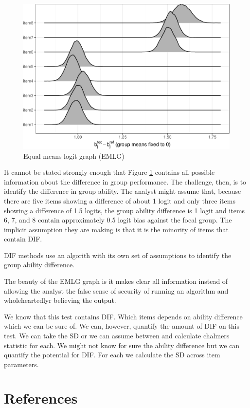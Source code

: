\documentclass[
  11pt,
]{article}
\begin{document}
\begin{figure}[H]

{\centering \includegraphics[width=0.7\linewidth]{paper_files/figure-latex/emlg-1} 

}

\caption{Equal means logit graph (EMLG)}\label{fig:emlg}
\end{figure}

It cannot be stated strongly enough that Figure \ref{fig:emlg} contains all possible information about the difference in group performance. The challenge, then, is to identify the difference in group ability. The analyst might assume that, because there are five items showing a difference of about 1 logit and only three items showing a difference of 1.5 logits, the group ability difference is 1 logit and items 6, 7, and 8 contain approximately 0.5 logit bias against the focal group. The implicit assumption they are making is that it is the minority of items that contain DIF.

DIF methods use an algorith with its own set of assumptions to identify the group ability difference.

The beauty of the EMLG graph is it makes clear all information instead of allowing the analyst the false sense of security of running an algorithm and wholeheartedlyr believing the output.

We know that this test contains DIF. Which items depends on ability difference which we can be sure of. We can, however, quantify the amount of DIF on this test. We can take the SD or we can assume between and calculate chalmers statistic for each. We might not know for sure the ability difference but we can quantify the potential for DIF. For each we calculate the SD across item parameters.

\hypertarget{references}{%
\section{References}\label{references}}
\end{document}
